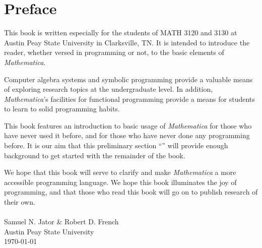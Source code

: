 \chapter*{Preface}

This book is written especially for the students of MATH 3120 and 3130 at Austin Peay State University in Clarksville, TN. It is intended to introduce the reader, whether versed in programming or not, to the basic elements of \emph{Mathematica}.

Computer algebra systems and symbolic programming provide a valuable means of exploring research topics at the undergraduate level. In addition, \emph{Mathematica}'s facilities for functional programming provide a means for students to learn to solid programming habits.

This book features an introduction to basic usage of \emph{Mathematica} for those who have never used it before, and for those who have never done any programming before. It is our aim that this preliminary section ``'' will provide enough background to get started with the remainder of the book.

We hope that this book will serve to clarify and make \emph{Mathematica} a more accessible programming language. We hope this book illuminates the joy of programming, and that those who read this book will go on to publish research of their own.\\
\\
Samuel N. Jator \& Robert D. French\\
Austin Peay State University\\
\today
